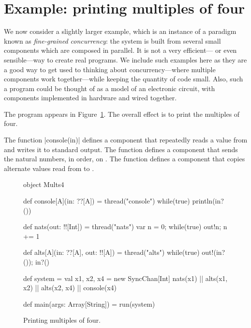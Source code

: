 
\section{Example: printing multiples of four}

We now consider a slightly larger example, which is an instance of a paradigm
known as \emph{fine-grained concurrency}: the system is built from several
small components which are composed in parallel.  It is not a very
efficient--- or even sensible---way to create real programs.  We include such
examples here as they are a good way to get used to thinking about
concurrency---where multiple components work together---while keeping the
quantity of code small.  Also, such a program could be thought of as a model
of an electronic circuit, with components implemented in hardware and wired
together.

The program appears in Figure~\ref{fig:Mults4}. The overall effect is to print
the multiples of four.

The function |console(in)| defines a component that repeatedly reads a value
from  and writes it to standard output.  The function
 defines a component that sends the natural numbers, in
order, on .  The function  defines a component
that copies alternate values read from  to .


\begin{figure}
\begin{scala}
object Mults4{
  def console[A](in: ??[A]) = thread("console"){ while(true) println(in?()) }

  def nats(out: !![Int]) = thread("nats"){ 
    var n = 0; while(true){ out!n; n += 1 }
  }

  def alts[A](in: ??[A], out: !![A]) = thread("alts"){ 
    while(true){ out!(in?()); in?() } 
  }

  def system = {
    val x1, x2, x4 = new SyncChan[Int]
    nats(x1) || alts(x1, x2) || alts(x2, x4) || console(x4)
  }

  def main(args: Array[String]) = run(system)
}
\end{scala}
\caption{Printing multiples of four.}
\label{fig:Mults4}
\end{figure}


